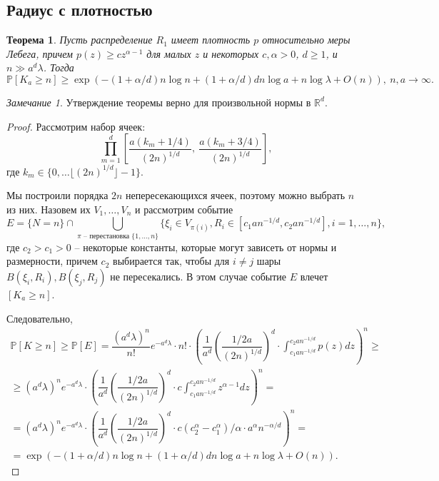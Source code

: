\documentclass[12pt]{article}
\theoremstyle{plain}
\newtheorem{thm}{Теорема} %
\theoremstyle{definition}
\theoremstyle{remark}
\newtheorem*{rem}{Замечание}
\def\geq{\geqslant}
\newcommand{\R}{\mathbb{R}}
\newcommand{\PP}{\mathbb{P}}
\begin{document}
\subsection{Радиус с плотностью}

\begin{thm}
Пусть распределение $R_1$ имеет плотность $p$ относительно меры Лебега, причем $p(z) \geq c z^{\alpha -1}$ для малых $z$ и некоторых $c, \alpha >0$, $d \geq 1$, и $n \gg a^d\lambda$.
Тогда $$\PP[K_a \geq n] \geq \exp\left(-\left(1 + \alpha/d\right)n\log n + (1 + \alpha/d)dn\log a + n\log \lambda + O(n)\right), \ n, a \to \infty.$$
\end{thm}{}

\begin{rem}
Утверждение теоремы верно для произвольной нормы в $\R^d$.
\end{rem}{}

\begin{proof}
Рассмотрим набор ячеек:
\begin{equation*}
    \prod_{m = 1}^d \left[\dfrac{a(k_m + 1/4)}{(2n)^{1/d}},\ \dfrac{a(k_m + 3/4)}{(2n)^{1/d}}\right],
\end{equation*}{}
где $k_m\in \{0, \ldots \lfloor(2n)^{1/d}\rfloor - 1\}$.

Мы построили порядка $2n$ непересекающихся ячеек, поэтому можно выбрать $n$ из них. Назовем их $V_1, \ldots, V_n$  и рассмотрим событие 
\begin{equation*}
    E = \{N=n\}\cap \bigcup\limits_{\pi \text{ -- перестановка } \{1, \ldots, n\}} \{\xi_i \in V_{\pi(i)}, R_i \in [c_1an^{-1/d}, c_2an^{-1/d}],  i = 1, \ldots, n\},
\end{equation*}
где $c_2 > c_1> 0$ -- некоторые константы, которые могут зависеть от нормы и размерности, причем $c_2$ выбирается так, чтобы для $i\not=j$ шары $B(\xi_i, R_i), B(\xi_j, R_j)$ не пересекались. В этом случае событие $E$ влечет $[K_a \geq n]$.

Следовательно, 
\begin{multline*}
    \PP[K \geq n] \geq \PP[E] = \dfrac{(a^d\lambda)^n}{n!}e^{-a^d\lambda}\cdot n! \cdot \left(\dfrac{1}{a^d}\left(\dfrac{1/2 a}{(2n)^{1/d}}\right)^d\cdot \int_{c_1an^{-1/d}}^{c_2an^{-1/d}} p(z) dz\right)^n \geq \\
    \geq (a^d\lambda)^n e^{-a^d\lambda} \cdot \left(\dfrac{1}{a^d}\left(\dfrac{1/2 a}{(2n)^{1/d}}\right)^d\cdot c \int_{c_1an^{-1/d}}^{c_2an^{-1/d}} z^{\alpha - 1} dz\right)^n = \\
    = (a^d\lambda)^n e^{-a^d\lambda} \cdot \left(\dfrac{1}{a^d}\left(\dfrac{1/2 a}{(2n)^{1/d}}\right)^d\cdot c (c_2^\alpha - c_1^\alpha)/\alpha \cdot a^\alpha n^{-\alpha/d}\right)^n = \\
    = \exp\left(-(1 + \alpha/d)n\log n + (1 + \alpha/d)dn\log a + n\log\lambda + O(n)\right).
\end{multline*}{}
\end{proof}{}
\end{document}
